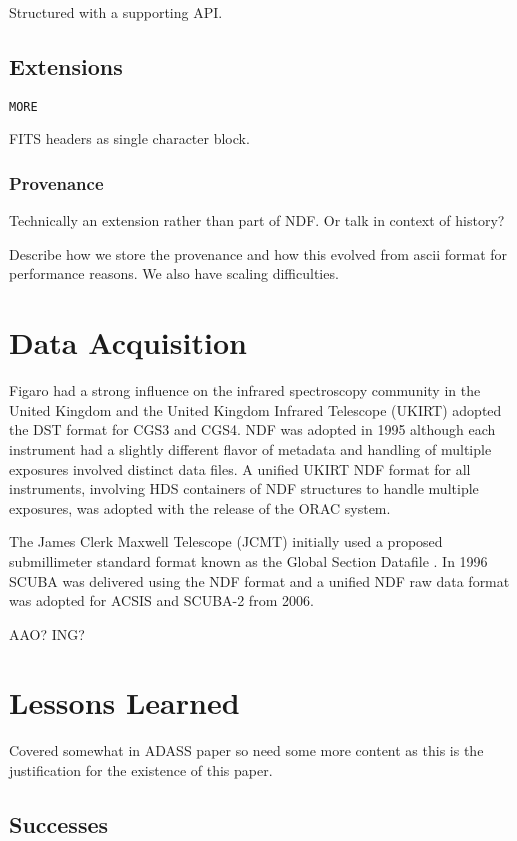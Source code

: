 \documentclass[final,authoryear,5p,times,twocolumn]{elsarticle}
\begin{document}
{Structured with a supporting API.

\subsection{Extensions}

\texttt{MORE}

FITS headers as single character block.

\subsubsection{Provenance}

Technically an extension rather than part of NDF. Or talk in context
of history?

Describe how we store the provenance and how this evolved from ascii
format for performance reasons. We also have scaling difficulties.

\section{Data Acquisition}

Figaro had a strong influence on the infrared spectroscopy community
in the United Kingdom and the United Kingdom Infrared Telescope
(UKIRT) adopted the DST format for CGS3 and CGS4. NDF was adopted in
1995 although each instrument had a slightly different flavor of
metadata and handling of multiple exposures involved distinct data
files. A unified UKIRT NDF format for all instruments, involving HDS
containers of NDF structures to handle multiple exposures, was
adopted with the release of the ORAC system.

The James Clerk Maxwell Telescope (JCMT) initially used a proposed
submillimeter standard format known as the Global Section Datafile
\citep[GSD;][formerly General Single Dish Data]{sun229}. In 1996 SCUBA
was delivered using the NDF format and a unified NDF raw data format
was adopted for ACSIS and SCUBA-2 from 2006.

{\color{red}AAO? ING?}

\section{Lessons Learned}

{\color{red} Covered somewhat in ADASS paper so need some more content as this is
the justification for the existence of this paper.}

\subsection{Successes}

}
\end{document}
